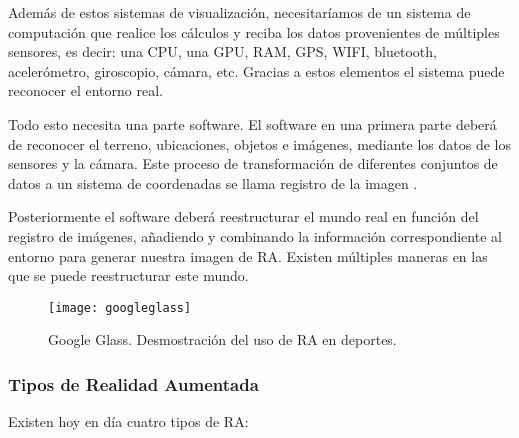 Además de estos sistemas de visualización, necesitaríamos de un sistema de computación que realice los cálculos y reciba los datos provenientes de múltiples sensores, es decir: una CPU, una GPU, RAM, GPS, WIFI, bluetooth, acelerómetro, giroscopio, cámara, etc. Gracias a estos elementos el sistema puede reconocer el entorno real.

Todo esto necesita una parte software. El software en una primera parte deberá de reconocer el terreno, ubicaciones, objetos e imágenes, mediante los datos de los sensores y la cámara. Este proceso de transformación de diferentes conjuntos de datos a un sistema de coordenadas se llama registro de la imagen \cite{URL::ImageRegister}. 

Posteriormente el software deberá reestructurar el mundo real en función del registro de imágenes, añadiendo y combinando la información correspondiente al entorno para generar nuestra imagen de RA. Existen múltiples maneras en las que se puede reestructurar este mundo. 

\begin{figure}[h]
    \centering
    \texttt{[image: googleglass]}
    \caption{Google Glass. Desmostración del uso de RA en deportes.}
    \label{fig:googleglass}
\end{figure}

\subsubsection{Tipos de Realidad Aumentada}

Existen hoy en día cuatro tipos de RA:

